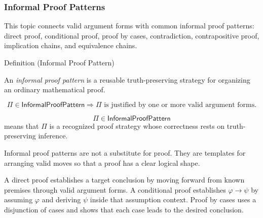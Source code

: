 \subsubsection*{Informal Proof Patterns}

\begin{remark*}
This topic connects valid argument forms with common informal proof patterns:
direct proof, conditional proof, proof by cases, contradiction, contrapositive
proof, implication chains, and equivalence chains.
\end{remark*}

\begin{definitionbox}{Definition (Informal Proof Pattern)}
\begin{definition}
\label{def:informal-proof-pattern-propositional-logic}
An \emph{informal proof pattern} is a reusable truth-preserving strategy for
organizing an ordinary mathematical proof.
\end{definition}
\end{definitionbox}

\begin{remark*}
\[
\Pi\in\mathsf{InformalProofPattern}
\Longrightarrow
\Pi\text{ is justified by one or more valid argument forms.}
\]
\end{remark*}

\begin{remark*}
\[
  \Pi\in\mathsf{InformalProofPattern}
\] means that \(\Pi\) is a recognized
proof strategy whose correctness rests on truth-preserving inference.
\end{remark*}

\begin{remark*}[Interpretation]
Informal proof patterns are not a substitute for proof. They are templates for
arranging valid moves so that a proof has a clear logical shape.
\end{remark*}

\begin{remark*}[Exposition]
A direct proof establishes a target conclusion by moving forward from known
premises through valid argument forms. A conditional proof establishes
\(\varphi\to\psi\) by assuming \(\varphi\) and deriving \(\psi\) inside that
assumption context. Proof by cases uses a disjunction of cases and shows that
each case leads to the desired conclusion.
\end{remark*}

